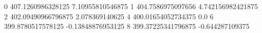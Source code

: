 0 407.1260986328125 7.10955810546875
1 404.7586975097656 4.742156982421875
2 402.09490966796875 2.078369140625
4 400.01654052734375 0.0
6 399.8780517578125 -0.13848876953125
8 399.37225341796875 -0.644287109375
